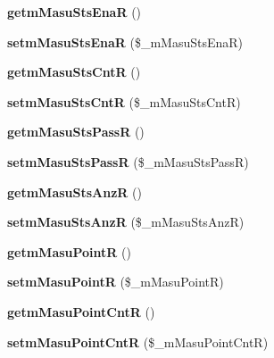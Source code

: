 \begin{DoxyCompactItemize}
{\bfseries getm\+Masu\+Sts\+EnaR} ()
\item 
\mbox{\label{class_reversi_a12de5517d872db381e89d318c2a75e6d}} 
{\bfseries setm\+Masu\+Sts\+EnaR} (\$\+\_\+m\+Masu\+Sts\+EnaR)
\item 
\mbox{\label{class_reversi_a370ffeac2b210aebf1f5b371bc00d7c9}} 
{\bfseries getm\+Masu\+Sts\+CntR} ()
\item 
\mbox{\label{class_reversi_a9ca61ff195b34e438add6692f41a6386}} 
{\bfseries setm\+Masu\+Sts\+CntR} (\$\+\_\+m\+Masu\+Sts\+CntR)
\item 
\mbox{\label{class_reversi_a2ec5a89484fd5c286448ff5a884c1632}} 
{\bfseries getm\+Masu\+Sts\+PassR} ()
\item 
\mbox{\label{class_reversi_aac545fa9b9ab9b67fe82df20cf8407f6}} 
{\bfseries setm\+Masu\+Sts\+PassR} (\$\+\_\+m\+Masu\+Sts\+PassR)
\item 
\mbox{\label{class_reversi_aa1079d1b51766bf3fc3f9b07b6576fd4}} 
{\bfseries getm\+Masu\+Sts\+AnzR} ()
\item 
\mbox{\label{class_reversi_abb23a9169bf5234ad622727aacb9c1c9}} 
{\bfseries setm\+Masu\+Sts\+AnzR} (\$\+\_\+m\+Masu\+Sts\+AnzR)
\item 
\mbox{\label{class_reversi_a0ca54cdec65e33e2bbaef3ec87753c71}} 
{\bfseries getm\+Masu\+PointR} ()
\item 
\mbox{\label{class_reversi_a07d115546600aa6b50ea911b6d007aa2}} 
{\bfseries setm\+Masu\+PointR} (\$\+\_\+m\+Masu\+PointR)
\item 
\mbox{\label{class_reversi_ae59671198100c6d1042e592c238bcf98}} 
{\bfseries getm\+Masu\+Point\+CntR} ()
\item 
\mbox{\label{class_reversi_aaf5eb7b8a9e6c579641091965b98403c}} 
{\bfseries setm\+Masu\+Point\+CntR} (\$\+\_\+m\+Masu\+Point\+CntR)
\item 
\mbox{\label{class_reversi_abb1a37c4605dd7eae7db5c1e1d49ca2f}} 

\end{DoxyCompactItemize}

